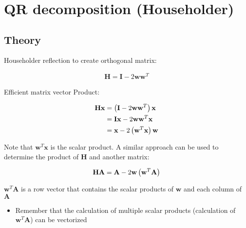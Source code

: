 \section{QR decomposition (Householder)}
\label{sec:QR}

\subsection{Theory}

Householder reflection to create orthogonal matrix:

\begin{align}
\mathbf{H} = \mathbf{I} - 2\mathbf{w}\mathbf{w}^T
\end{align}

Efficient matrix vector Product:

\begin{align}
\nonumber
\mathbf{H} \mathbf{x}
&= 
\left(\mathbf{I} - 2\mathbf{w}\mathbf{w}^T\right)\mathbf{x}
\\&= 
\nonumber
\mathbf{I}\mathbf{x} - 2\mathbf{w}\mathbf{w}^T\mathbf{x}
\\&= 
\mathbf{x} - 2\left(\mathbf{w}^T\mathbf{x}\right)\mathbf{w}
\end{align}

Note that $\mathbf{w}^T\mathbf{x}$ is the scalar product. 
A similar approach can be used to determine the product of $\mathbf{H}$ and another matrix:

\begin{align}
\nonumber
\mathbf{H} \mathbf{A}
=
\mathbf{A} - 2\mathbf{w}\left(\mathbf{w}^T\mathbf{A}\right)
\end{align}

$\mathbf{w}^T\mathbf{A}$ is a row vector that contains the scalar products of $\mathbf{w}$ and each column of $\mathbf{A}$

\begin{itemize}
\item Remember that the calculation of multiple scalar products (calculation of $\mathbf{w}^T\mathbf{A}$) can be vectorized
\end{itemize}